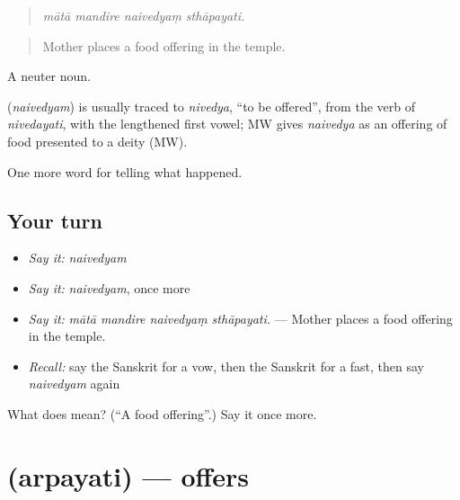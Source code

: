 \begin{quote}
   
\end{quote}

\begin{quote}
\emph{mātā mandire naivedyaṃ sthāpayati.}
\end{quote}

\begin{quote}
Mother places a food offering in the temple.
\end{quote}

A neuter noun.

\begin{cousinweb}
\textbf{} (\emph{naivedyam}) is usually traced to \emph{nivedya}, \textquotedblleft{}to be offered\textquotedblright{}, from the verb of \emph{nivedayati}, with the lengthened first vowel; MW gives \emph{naivedya} as an offering of food presented to a deity (MW).
\end{cousinweb}

\begin{grammarlens}[title={What you've built}]
One more word for telling what happened.
\end{grammarlens}

\subsection*{Your turn}
\begin{itemize}
\raggedright
  \item \emph{Say it:} \emph{naivedyam}
  \item \emph{Say it:} \emph{naivedyam}, once more
  \item \emph{Say it:} \emph{mātā mandire naivedyaṃ sthāpayati.} — Mother places a food offering in the temple.
  \item \emph{Recall:} say the Sanskrit for a vow, then the Sanskrit for a fast, then say \emph{naivedyam} again
\end{itemize}

\begin{tcolorbox}[breakable,colback=teal!4,colframe=teal!35!black,title={Before you move on}]
What does  mean? (\textquotedblleft{}A food offering\textquotedblright{}.) Say it once more.
\end{tcolorbox}
\section[\texorpdfstring{\sk{अर्पयति} (arpayati)}{अर्पयति (arpayati)}]{ (arpayati) — offers}

